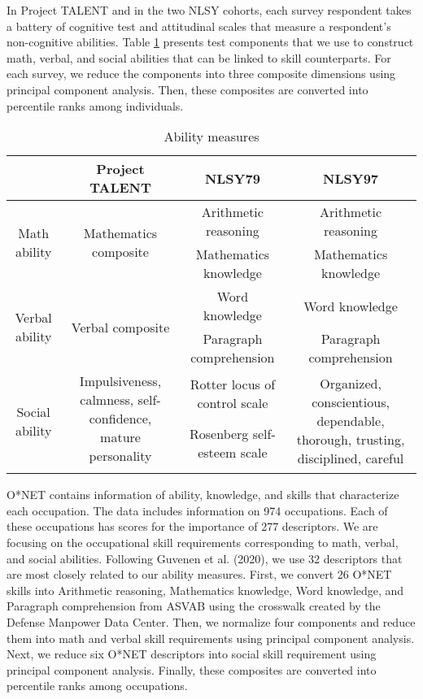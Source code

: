 \documentclass{article}
\begin{document}
In Project TALENT and in the two NLSY cohorts, each survey respondent takes a battery of cognitive test and attitudinal scales that measure a respondent's non-cognitive abilities. Table \ref{tab:ability} presents test components that we use to construct math, verbal, and social abilities that can be linked to skill counterparts. For each survey, we reduce the components into three composite dimensions using principal component analysis. Then, these composites are converted into percentile ranks among individuals.

\begin{table}[ht!]
	\begin{center}
		\begin{tabular}{|| c | c | c | c |} 
			\hline
			 & Project TALENT & NLSY79 & NLSY97\\ [0.1ex] 
			\hline\hline
			\multirow{2}{2.1cm}{\centering Math ability} & \multirow{2}{3.9cm}{\centering Mathematics composite} & Arithmetic reasoning & Arithmetic reasoning \\ 
			 & & Mathematics knowledge & Mathematics knowledge \\ 
			 \hline
			\multirow{2}{2.1cm}{\centering Verbal ability} & \multirow{2}{3.9cm}{\centering Verbal composite} & Word knowledge & Word knowledge \\ 
			 &  & Paragraph comprehension & Paragraph comprehension \\ 
			 \hline
			\multirow{3}{2.1cm}{\centering Social ability} & \multirow{2}{3.9cm}{\centering Impulsiveness, calmness, self-confidence, mature personality} & Rotter locus of control scale & \multirow{3}{5cm}{\centering Organized, conscientious, dependable, thorough, trusting, disciplined, careful} \\ 
			 & & Rosenberg self-esteem scale &   \\
			 &  &  &  \\
			\hline
		\end{tabular}
		    \caption{Ability measures}\label{tab:ability}
	\end{center}
\end{table}

O*NET contains information of ability, knowledge, and skills that characterize each occupation. The data includes information on 974 occupations. Each of these occupations has scores for the importance of 277 descriptors. We are focusing on the occupational skill requirements corresponding to math, verbal, and social abilities. Following Guvenen et al. (2020), we use 32 descriptors that are most closely related to our ability measures. First, we convert 26 O*NET skills into Arithmetic reasoning, Mathematics knowledge, Word knowledge, and Paragraph comprehension from ASVAB using the crosswalk created by the Defense Manpower Data Center. Then, we normalize four components and reduce them into math and verbal skill requirements using principal component analysis. Next, we reduce six O*NET descriptors into social skill requirement using principal component analysis. Finally, these composites are converted into percentile ranks among occupations.
\end{document}
